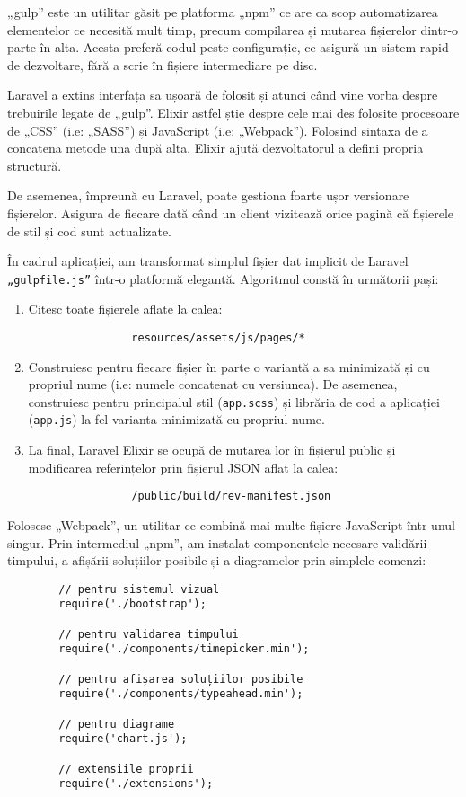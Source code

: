 		„gulp” este un utilitar găsit pe platforma „npm” ce are ca scop automatizarea elementelor ce necesită mult timp, precum compilarea și mutarea fișierelor dintr-o parte în alta.
		Acesta preferă codul peste configurație, ce asigură un sistem rapid de dezvoltare, fără a scrie în fișiere intermediare pe disc.

		Laravel a extins interfața sa ușoară de folosit și atunci când vine vorba despre trebuirile legate de „gulp”.
		Elixir astfel știe despre cele mai des folosite procesoare de „CSS” (i.e: „SASS”) și JavaScript (i.e: „Webpack”).
		Folosind sintaxa de a concatena metode una după alta, Elixir ajută dezvoltatorul a defini propria structură.

		De asemenea, împreună cu Laravel, poate gestiona foarte ușor versionare fișierelor.
		Asigura de fiecare dată când un client vizitează orice pagină că fișierele de stil și cod sunt actualizate.

		În cadrul aplicației, am transformat simplul fișier dat implicit de Laravel \verb|„gulpfile.js”| într-o platformă elegantă.
		Algoritmul constă în următorii pași:
		\begin{enumerate}
			\item Citesc toate fișierele aflate la calea:
			\begin{verbatim}
				resources/assets/js/pages/*
			\end{verbatim}
			\item
			Construiesc pentru fiecare fișier în parte o variantă a sa minimizată și cu propriul nume (i.e: numele concatenat cu versiunea).
			De asemenea, construiesc pentru principalul stil (\verb|app.scss|) și librăria de cod a aplicației (\verb|app.js|) la fel varianta minimizată cu propriul nume.
			\item
			La final, Laravel Elixir se ocupă de mutarea lor în fișierul public și modificarea referințelor prin fișierul JSON aflat la calea:
			\begin{verbatim}
				/public/build/rev-manifest.json
			\end{verbatim}
		\end{enumerate}

		Folosesc „Webpack”, un utilitar ce combină mai multe fișiere JavaScript într-unul singur.
		Prin intermediul „npm”, am instalat componentele necesare validării timpului, a afișării soluțiilor posibile și a diagramelor prin simplele comenzi:
		\begin{verbatim}
		// pentru sistemul vizual
		require('./bootstrap');

		// pentru validarea timpului
		require('./components/timepicker.min');

		// pentru afișarea soluțiilor posibile
		require('./components/typeahead.min');

		// pentru diagrame
		require('chart.js');

		// extensiile proprii
		require('./extensions');
		\end{verbatim}

